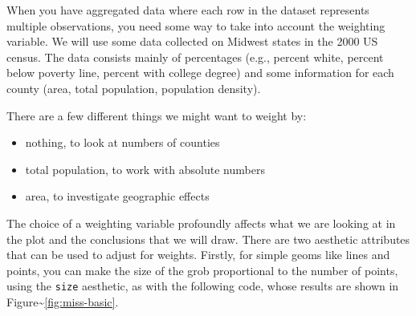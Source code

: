 When you have aggregated data where each row in the dataset represents
multiple observations, you need some way to take into account the
weighting variable. We will use some data collected on Midwest states in
the 2000 US census. The data consists mainly of percentages (e.g.,
percent white, percent below poverty line, percent with college degree)
and some information for each county (area, total population, population
density). 

There are a few different things we might want to weight by:

\begin{itemize}
\itemsep1pt\parskip0pt
\item
  nothing, to look at numbers of counties
\item
  total population, to work with absolute numbers
\item
  area, to investigate geographic effects
\end{itemize}

\noindent The choice of a weighting variable profoundly affects what we
are looking at in the plot and the conclusions that we will draw. There
are two aesthetic attributes that can be used to adjust for weights.
Firstly, for simple geoms like lines and points, you can make the size
of the grob proportional to the number of points, using the
\texttt{size} aesthetic, as with the following code, whose results are
shown in Figure\textasciitilde{}\ref{fig:miss-basic}.

\begin{Shaded}
\begin{Highlighting}[]
 
 
   \StringTok{ }\NormalTok{) +}\StringTok{ }\NormalTok{(}\NormalTok{, }
   \NormalTok{(}\NormalTok{, }\NormalTok{, }\NormalTok{, }\NormalTok{))}
  \StringTok{ }
\StringTok{  }\NormalTok{()}
\end{Highlighting}
\end{Shaded}

